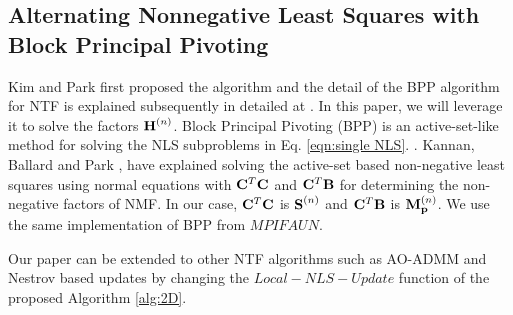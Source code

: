 \subsection{Alternating Nonnegative Least Squares with Block Principal Pivoting}
\label{sec:BPP}

Kim and Park \cite{KP2011} first proposed the algorithm and the detail of the BPP algorithm for NTF is explained subsequently in detailed at \cite{KHP2014}. In this paper, we will leverage it to solve the factors $\Mn{H}{n}$. 
Block Principal Pivoting (BPP) is an active-set-like method for solving the NLS subproblems in Eq. \eqref{eqn:single NLS}.
. 
Kannan, Ballard and Park \cite{KBP2018}, have explained solving the active-set based non-negative least squares 
using normal equations with $\mathbf{C}^T\mathbf{C}$ and $\mathbf{C}^T\mathbf{B}$ for determining the non-negative factors of NMF. 
In our case, $\mathbf{C}^T\mathbf{C}$ is $\Mn{S}{n}$ and $\mathbf{C}^T\mathbf{B}$ is $\Mn{M}{n}_{\V{p}}$. We use the same implementation
of BPP from $MPIFAUN$.

Our paper can be extended to other NTF algorithms such as AO-ADMM \cite{HSL2015} and Nestrov based updates
\cite{LKLHS2017} by changing the $Local-NLS-Update$ function of the proposed Algorithm \ref{alg:2D}. 
